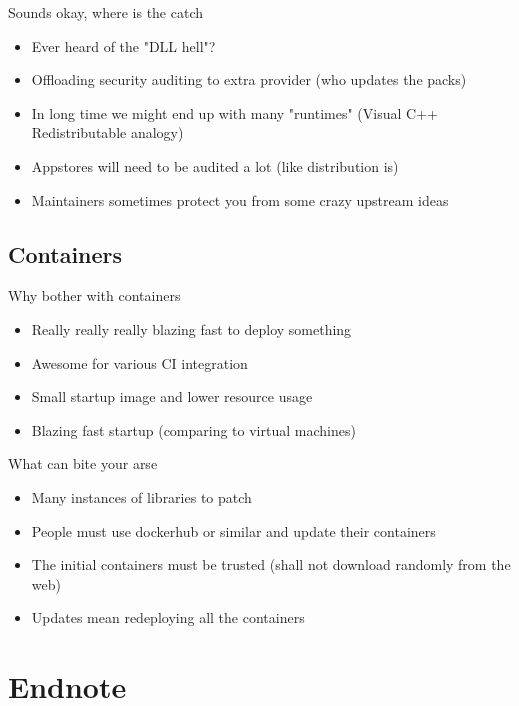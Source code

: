 \documentclass{beamer}
\begin{document}
\begin{frame}[t]{Sounds okay, where is the catch}
	\begin{itemize}
    \item Ever heard of the "DLL hell"?
    \item Offloading security auditing to extra provider (who updates the packs)
    \item In long time we might end up with many "runtimes" (Visual C++ Redistributable analogy)
    \item Appstores will need to be audited a lot (like distribution is)
    \item Maintainers sometimes protect you from some crazy upstream ideas
	\end{itemize}
\end{frame}

\subsection{Containers}

\begin{frame}[t]{Why bother with containers}
    \begin{itemize}
	\item Really really really blazing fast to deploy something
	\item Awesome for various CI integration
	\item Small startup image and lower resource usage
	\item Blazing fast startup (comparing to virtual machines)
	\end{itemize}
\end{frame}

\begin{frame}[t]{What can bite your arse}
	\begin{itemize}
	\item Many instances of libraries to patch
	\item People must use dockerhub or similar and update their containers
	\item The initial containers must be trusted (shall not download randomly from the web)
	\item Updates mean redeploying all the containers
	\end{itemize}
\end{frame}

\section{Endnote}
\end{document}
